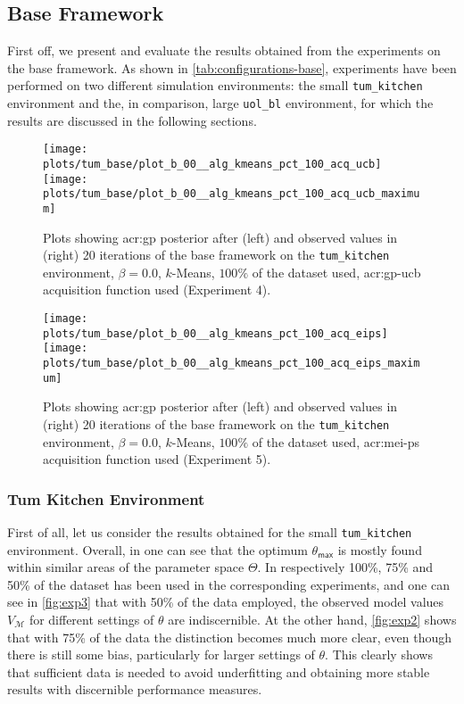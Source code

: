\subsection{Base Framework}
\label{sec:base-framework-results}

First off, we present and evaluate the results obtained from the experiments on the base framework.
As shown in \autoref{tab:configurations-base}, experiments have been performed on two different simulation environments: the small \texttt{tum\_kitchen} environment and the, in comparison, large \texttt{uol\_bl} environment, for which the results are discussed in the following sections.

	\begin{figure}
		\centering
		\texttt{[image: plots/tum\_base/plot\_b\_00\_\_alg\_kmeans\_pct\_100\_acq\_ucb]}
		\texttt{[image: plots/tum\_base/plot\_b\_00\_\_alg\_kmeans\_pct\_100\_acq\_ucb\_maximum]}
		\caption{Plots showing \acrshort{acr:gp}  posterior after (left) and observed values in (right) 20 iterations of the base framework on the \texttt{tum\_kitchen} environment, $\beta = 0.0$, $k$-Means, $100\%$ of the dataset used, \acrshort{acr:gp-ucb} acquisition function used (Experiment 4).}
		\label{fig:exp4}
	\end{figure}
	\begin{figure}
		\centering
		\texttt{[image: plots/tum\_base/plot\_b\_00\_\_alg\_kmeans\_pct\_100\_acq\_eips]}
		\texttt{[image: plots/tum\_base/plot\_b\_00\_\_alg\_kmeans\_pct\_100\_acq\_eips\_maximum]}
		\caption{Plots showing \acrshort{acr:gp} posterior after (left) and observed values in (right) 20 iterations of the base framework on the \texttt{tum\_kitchen} environment, $\beta = 0.0$, $k$-Means, $100\%$ of the dataset used, \acrshort{acr:mei-ps} acquisition function used (Experiment 5).}
		\label{fig:exp5}
	\end{figure}

\subsubsection{Tum Kitchen Environment}

First of all, let us consider the results obtained for the small \texttt{tum\_kitchen} environment.
Overall, in  one can see that the optimum $\theta_\mathsf{max}$ is mostly found within similar areas of the parameter space $\Theta$.
In  respectively 100\%, 75\% and 50\% of the dataset has been used in the corresponding experiments, and one can see in \autoref{fig:exp3} that with 50\% of the data employed, the observed model values $V_\mathcal{M}$ for different settings of $\theta$ are indiscernible.
At the other hand, \autoref{fig:exp2} shows that with 75\% of the data the distinction becomes much more clear, even though there is still some bias, particularly for larger settings of $\theta$.
This clearly shows that sufficient data is needed to avoid underfitting and obtaining more stable results with discernible performance measures.

